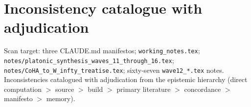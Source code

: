 \documentclass[11pt]{article}
\theoremstyle{definition}
\theoremstyle{remark}
\begin{document}
\section{Inconsistency catalogue with adjudication}
\label{sec:inconsistency}

Scan target: three CLAUDE.md manifestos; \texttt{working\_notes.tex};
\texttt{notes/platonic\_synthesis\_waves\_11\_through\_16.tex};
\texttt{notes/CoHA\_to\_W\_infty\_treatise.tex}; sixty-seven
\texttt{wave12\_*.tex} notes. Inconsistencies catalogued with
adjudication from the epistemic hierarchy (direct computation
$>$ source $>$ build $>$ primary literature $>$ concordance $>$
manifesto $>$ memory).

\renewcommand{\arraystretch}{1.25}
\end{document}
